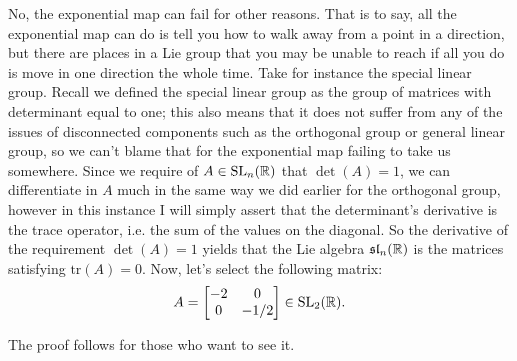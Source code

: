 \documentclass[11pt]{article}
\begin{document}
No, the exponential map can fail for other reasons. That is to say, all the exponential map can do is tell you how to walk away from a point in a direction, but there are places in a Lie group that you may be unable to reach if all you do is move in one direction the whole time. Take for instance the special linear group. Recall we defined the special linear group as the group of matrices with determinant equal to one; this also means that it does not suffer from any of the issues of disconnected components such as the orthogonal group or general linear group, so we can't blame that for the exponential map failing to take us somewhere. Since we require of $A \in \mathrm{SL}_n(\mathbb{R})$ that $\det(A) = 1$, we can differentiate in $A$ much in the same way we did earlier for the orthogonal group, however in this instance I will simply assert that the determinant's derivative is the trace operator, i.e. the sum of the values on the diagonal. So the derivative of the requirement $\det(A) = 1$ yields that the Lie algebra $\mathfrak{sl}_n(\mathbb{R})$ is the matrices satisfying $\mathrm{tr}(A) = 0$. Now, let's select the following matrix: \begin{gather*}
A = \begin{bmatrix}
-2 & 0 \\ 0 & -1/2
\end{bmatrix} \in \mathrm{SL}_2(\mathbb{R}).
\end{gather*}

The proof follows for those who want to see it.
\end{document}
